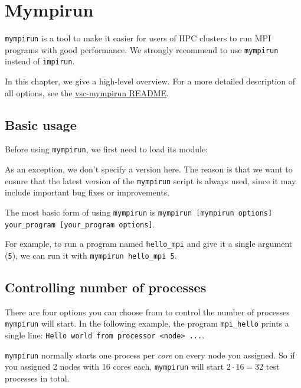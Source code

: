 \chapter{Mympirun}
\label{ch:mympirun}

\lstinline|mympirun| is a tool to make it easier for users of HPC clusters to run
MPI programs with good performance. We strongly recommend to use \lstinline|mympirun|
instead of \lstinline|impirun|.

In this chapter, we give a high-level overview. For a more detailed description of all
options, see the
\href{https://github.com/hpcugent/vsc-mympirun/blob/master/README.md}{vsc-mympirun README}.

\section{Basic usage}
\label{sec:myrun-basic-usage}

Before using \lstinline|mympirun|, we first need to load its module:

\begin{prompt}
\end{prompt}

As an exception, we don't specify a version here. The reason is that we want to ensure
that the latest version of the \lstinline|mympirun| script is always used, since it may
include important bug fixes or improvements.

The most basic form of using \lstinline|mympirun| is \lstinline|mympirun [mympirun options] your_program [your_program options]|.

For example, to run a program named \lstinline|hello_mpi| and give it a single argument (\lstinline|5|),
we can run it with \lstinline|mympirun hello_mpi 5|.


\section{Controlling number of processes}

There are four options you can choose from to control the number of processes
\lstinline|mympirun| will start. In the following example, the program \lstinline|mpi_hello|
prints a single line: \lstinline|Hello world from processor <node> ...|.

\lstinline|mympirun| normally starts one process per \emph{core} on every node you assigned.
So if you assigned 2 nodes with 16 cores each, \lstinline|mympirun| will
start $2\cdot16=32$ test processes in total.

